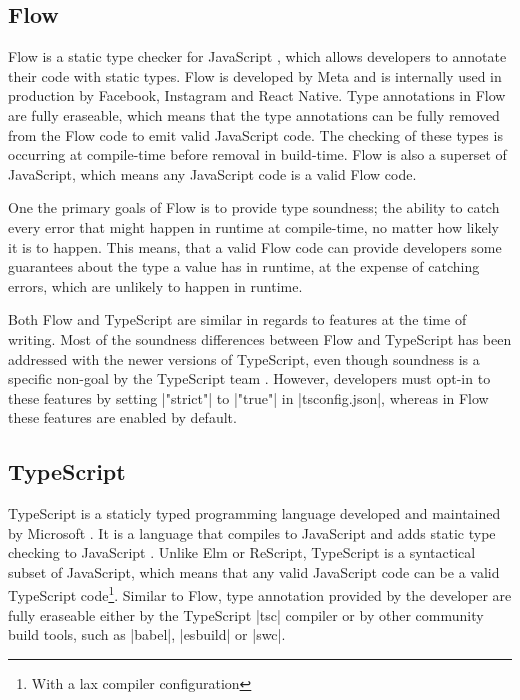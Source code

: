 \subsection{Flow}

Flow is a static type checker for JavaScript \cite{chaudhuriFastPreciseType2017,Flow2023}, which allows developers to annotate their code with static types. Flow is developed by Meta and is internally used in production by Facebook, Instagram and React Native. Type annotations in Flow are fully eraseable, which means that the type annotations can be fully removed from the Flow code to emit valid JavaScript code. The checking of these types is occurring at compile-time before removal in build-time. Flow is also a superset of JavaScript, which means any JavaScript code is a valid Flow code.

One the primary goals of Flow is to provide type soundness; the ability to catch every error that might happen in runtime at compile-time, no matter how likely it is to happen. This means, that a valid Flow code can provide developers some guarantees about the type a value has in runtime, at the expense of catching errors, which are unlikely to happen in runtime.

Both Flow and TypeScript are similar in regards to features at the time of writing. Most of the soundness differences between Flow and TypeScript has been addressed with the newer versions of TypeScript, even though soundness is a specific non-goal by the TypeScript team \cite{TypeScriptDesignGoals}. However, developers must opt-in to these features by setting \codeword|"strict"| to \codeword|"true"| in \codeword|tsconfig.json|, whereas in Flow these features are enabled by default.

\subsection{TypeScript}

TypeScript is a staticly typed programming language developed and maintained by Microsoft \cite{TypeScriptJavaScriptSyntax}. It is a language that compiles to JavaScript and adds static type checking to JavaScript \cite{DocumentationTypeScriptJavaScript}. Unlike Elm or ReScript, TypeScript is a syntactical subset of JavaScript, which means that any valid JavaScript code can be a valid TypeScript code\footnote{With a lax compiler configuration}. Similar to Flow, type annotation provided by the developer are fully eraseable either by the TypeScript \codeword|tsc| compiler or by other community build tools, such as \codeword|babel|\cite{BabelCompilerNext}, \codeword|esbuild|\cite{EsbuildExtremelyFast} or \codeword|swc|\cite{SWCRustbasedPlatform}.

